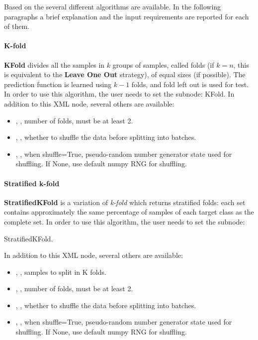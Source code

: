 Based on the  several different algorithms are available. In the following paragraphs a brief
explanation and the input requirements are reported for each of them.

\paragraph{K-fold}
\textbf{KFold} divides all the samples in $k$ groups of samples, called folds (if $k=n$, this is equivalent to the
\textbf{Leave One Out} strategy), of equal sizes (if possible). The prediction function is learned using $k-1$ folds,
and fold left out is used for test.
In order to use this algorithm, the user needs to set the subnode:
KFold.
In addition to this XML node, several others are available:
\begin{itemize}
  \item {}, , number of folds, must be at least 2. 
  \item {}, , whether to shuffle the data before splitting into
    batches.
  \item {}, , when shuffle=True,
    pseudo-random number generator state used for shuffling. If None, use default numpy RNG for shuffling.
\end{itemize}

\paragraph{Stratified k-fold}
\textbf{StratifiedKFold} is a variation of \textit{k-fold} which returns stratified folds: each set contains approximately
the same percentage of samples of each target class as the complete set.
In order to use this algorithm, the user needs to set the subnode:

StratifiedKFold.

In addition to this XML node, several others are available:
\begin{itemize}
  \item {}, , samples to split in K folds.
  \item {}, , number of folds, must be at least 2. 
  \item {}, , whether to shuffle the data before splitting into
    batches.
  \item {}, , when shuffle=True,
    pseudo-random number generator state used for shuffling. If None, use default numpy RNG for shuffling.
\end{itemize}

